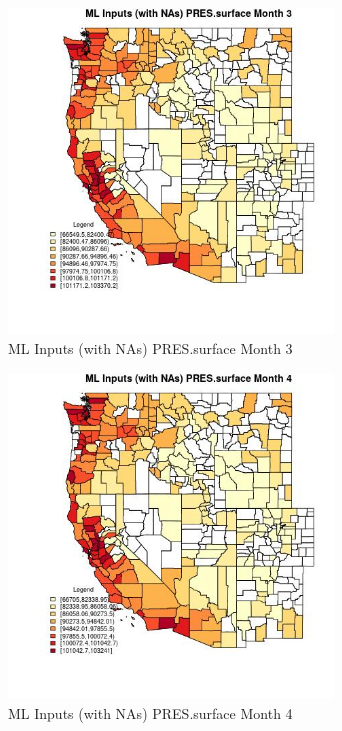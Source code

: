 \begin{figure} 
\centering  
\includegraphics[width=0.77\textwidth]{Code_Outputs/Report_ML_input_PM25_Step4_part_e_de_duplicated_aves_compiled_2019-05-21wNAs_CountyPRESsurfacemedianMonth3.jpg} 
\caption{\label{fig:Report_ML_input_PM25_Step4_part_e_de_duplicated_aves_compiled_2019-05-21wNAsCountyPRESsurfacemedianMonth3}ML Inputs (with NAs) PRES.surface Month 3} 
\end{figure} 
 

\begin{figure} 
\centering  
\includegraphics[width=0.77\textwidth]{Code_Outputs/Report_ML_input_PM25_Step4_part_e_de_duplicated_aves_compiled_2019-05-21wNAs_CountyPRESsurfacemedianMonth4.jpg} 
\caption{\label{fig:Report_ML_input_PM25_Step4_part_e_de_duplicated_aves_compiled_2019-05-21wNAsCountyPRESsurfacemedianMonth4}ML Inputs (with NAs) PRES.surface Month 4} 
\end{figure} 
 

